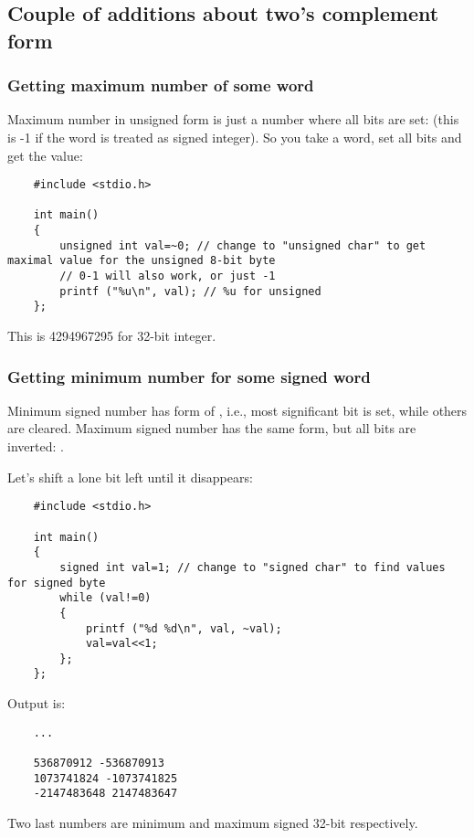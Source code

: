 \subsection{Couple of additions about two's complement form}

\subsubsection{Getting maximum number of some \gls{word}}

Maximum number in unsigned form is just a number where all bits are set: 
(this is -1 if the \gls{word} is treated as signed integer).
So you take a \gls{word}, set all bits and get the value:

\begin{lstlisting}
	#include <stdio.h>

	int main()
	{
		unsigned int val=~0; // change to "unsigned char" to get maximal value for the unsigned 8-bit byte
		// 0-1 will also work, or just -1
		printf ("%u\n", val); // %u for unsigned
	};
\end{lstlisting}

This is 4294967295 for 32-bit integer.

\subsubsection{Getting minimum number for some signed \gls{word}}

Minimum signed number has form of , i.e., most significant bit is set, while others are cleared.
Maximum signed number has the same form, but all bits are inverted: .

Let's shift a lone bit left until it disappears:

\begin{lstlisting}
	#include <stdio.h>

	int main()
	{
		signed int val=1; // change to "signed char" to find values for signed byte
		while (val!=0)
		{
			printf ("%d %d\n", val, ~val);
			val=val<<1;
		};
	};
\end{lstlisting}

Output is:

\begin{lstlisting}
	...

	536870912 -536870913
	1073741824 -1073741825
	-2147483648 2147483647
\end{lstlisting}

Two last numbers are minimum and maximum signed 32-bit  respectively.

